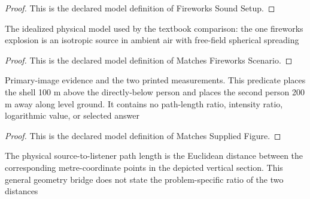 \begin{proof}
  This is the declared model definition of Fireworks Sound Setup.
\end{proof}
\begin{definition}
  \label{def:physics:phyx-mini-0216:phyxminiproblems-problemphyxmini0216-matchesfireworksscenario}
  The idealized physical model used by the textbook comparison: the one fireworks explosion is an isotropic source in ambient air with free-field spherical spreading
\end{definition}
\begin{proof}
  This is the declared model definition of Matches Fireworks Scenario.
\end{proof}
\begin{definition}
  \label{def:physics:phyx-mini-0216:phyxminiproblems-problemphyxmini0216-matchessuppliedfigure}
  Primary-image evidence and the two printed measurements. This predicate places the shell 100 m above the directly-below person and places the second person 200 m away along level ground. It contains no path-length ratio, intensity ratio, logarithmic value, or selected answer
\end{definition}
\begin{proof}
  This is the declared model definition of Matches Supplied Figure.
\end{proof}
\begin{definition}
  \label{def:physics:phyx-mini-0216:phyxminiproblems-problemphyxmini0216-sourcedistancesfollowfiguregeometry}
  The physical source-to-listener path length is the Euclidean distance between the corresponding metre-coordinate points in the depicted vertical section. This general geometry bridge does not state the problem-specific ratio of the two distances
\end{definition}
